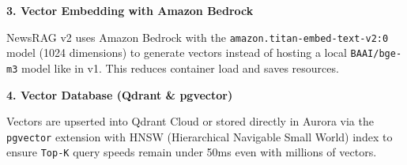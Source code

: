 \textbf{3. Vector Embedding with Amazon Bedrock}

NewsRAG v2 uses Amazon Bedrock with the
\texttt{amazon.titan-embed-text-v2:0} model (1024 dimensions) to
generate vectors instead of hosting a local \texttt{BAAI/bge-m3} model
like in v1. This reduces container load and saves resources.

\begin{Shaded}
\begin{Highlighting}[]

\OperatorTok{=}\OperatorTok{=}\NormalTok{)}

\OperatorTok{=}
\OperatorTok{=}
\OperatorTok{=}\NormalTok{,}
\OperatorTok{=}\NormalTok{,}
\OperatorTok{=}\NormalTok{,}
\OperatorTok{=}
\NormalTok{    )}
\OperatorTok{=}
    \NormalTok{)}
\end{Highlighting}
\end{Shaded}

\textbf{4. Vector Database (Qdrant \& pgvector)}

Vectors are upserted into Qdrant Cloud or stored directly in Aurora via
the \texttt{pgvector} extension with HNSW (Hierarchical Navigable Small
World) index to ensure \texttt{Top-K} query speeds remain under 50ms
even with millions of vectors.
